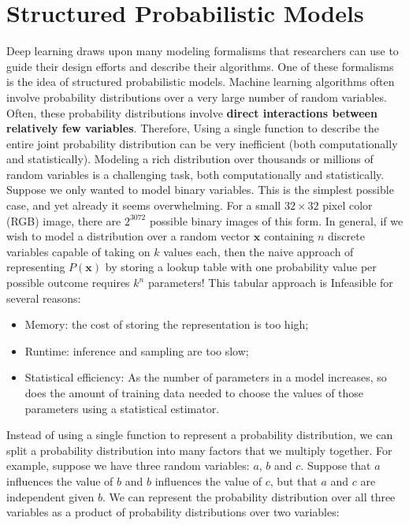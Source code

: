 \section{Structured Probabilistic Models}
Deep learning draws upon many modeling formalisms that researchers can use to guide their design efforts and describe their algorithms. One of these formalisms is the idea of structured probabilistic models.\newline\newline
Machine learning algorithms often involve probability distributions over a very large number of random variables. Often, these probability distributions involve \textbf{direct interactions between relatively few variables}. Therefore, Using a single function to describe the entire joint probability distribution can be very inefficient (both computationally and statistically).\newline\newline
Modeling a rich distribution over thousands or millions of random variables is a challenging task, both computationally and statistically. Suppose we only wanted to model binary variables. This is the simplest possible case, and yet already it seems overwhelming. For a small $32 \times 32$ pixel color (RGB) image, there are $2^{3072}$ possible binary images of this form.\newline\newline
In general, if we wish to model a distribution over a random vector $\textbf{x}$ containing $n$ discrete variables capable of taking on $k$ values each, then the naive approach of representing $P(\textbf{x})$ by storing a lookup table with one probability value per possible outcome requires $k^n$ parameters!\newline\newline
This tabular approach is Infeasible for several reasons:
\begin{itemize}
    \item Memory: the cost of storing the representation is too high;

    \item Runtime: inference and sampling are too slow;

    \item Statistical efficiency: As the number of parameters in a model increases, so does the amount of training data needed to choose the values of those parameters using a statistical estimator.
\end{itemize}
Instead of using a single function to represent a probability distribution, we can split a probability distribution into many factors that we multiply together. For example, suppose we have three random variables: $a$, $b$ and $c$. Suppose that $a$ influences the value of $b$ and $b$ influences the value of $c$, but that $a$ and $c$ are independent given $b$. We can represent the probability distribution over all three variables as a product of probability distributions over two variables:
